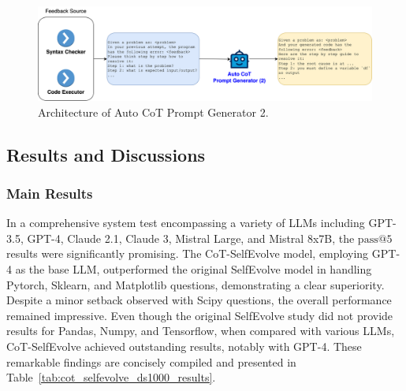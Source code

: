 \documentclass[a4paper,oneside]{book}
\begin{document}
\begin{figure}[H]
    \centering
    \includegraphics[width=1.0\textwidth]{img/cot_generator_2}
    \caption{Architecture of Auto CoT Prompt Generator 2.}\label{fig:cot_generator_2}
\end{figure}

\subsection{Results and Discussions}
\subsubsection{Main Results}
In a comprehensive system test encompassing a variety of LLMs including GPT-3.5, GPT-4, Claude 2.1, Claude 3, Mistral Large, and Mistral 8x7B, the $\text{pass@5}$ results were significantly promising. The CoT-SelfEvolve model, employing GPT-4 as the base LLM, outperformed the original SelfEvolve model in handling Pytorch, Sklearn, and Matplotlib questions, demonstrating a clear superiority. Despite a minor setback observed with Scipy questions, the overall performance remained impressive. Even though the original SelfEvolve study did not provide results for Pandas, Numpy, and Tensorflow, when compared with various LLMs, CoT-SelfEvolve achieved outstanding results, notably with GPT-4. These remarkable findings are concisely compiled and presented in Table~\ref{tab:cot_selfevolve_ds1000_results}.
\end{document}
